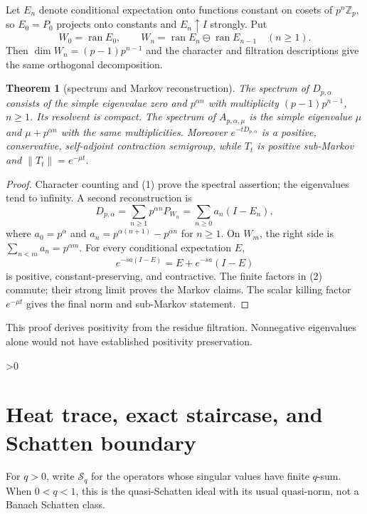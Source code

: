 \documentclass[10pt]{article}
\providecommand{\CRevisionRound}{2}
\newtheorem{theorem}{Theorem}
\newcommand{\Zp}{\mathbb Z_p}
\newcommand{\ran}{\operatorname{ran}}
\begin{document}
Let $E_n$ denote conditional expectation onto functions constant on cosets of
$p^n\Zp$, so $E_0=P_0$ projects onto constants and $E_n\uparrow I$ strongly.
Put
\[
 W_0=\ran E_0,\qquad W_n=\ran E_n\ominus\ran E_{n-1}\quad(n\geq1).
\]
Then $\dim W_n=(p-1)p^{n-1}$ and the character and filtration descriptions
give the same orthogonal decomposition.

\begin{theorem}[spectrum and Markov reconstruction]
The spectrum of $D_{p,\alpha}$ consists of the simple eigenvalue zero and
$p^{\alpha n}$ with multiplicity $(p-1)p^{n-1}$, $n\geq1$.  Its resolvent is
compact.  The spectrum of $A_{p,\alpha,\mu}$ is the simple eigenvalue $\mu$
and $\mu+p^{\alpha n}$ with the same multiplicities.  Moreover
$e^{-tD_{p,\alpha}}$ is a positive, conservative,
self-adjoint contraction semigroup, while $T_t$ is positive sub-Markov and
$\lVert T_t\rVert=e^{-\mu t}$.
\end{theorem}
\begin{proof}
Character counting and (1) prove the spectral assertion; the eigenvalues tend
to infinity.  A second reconstruction is
\begin{equation}
 D_{p,\alpha}=\sum_{n\geq1}p^{\alpha n}P_{W_n}
 =\sum_{n\geq0}a_n(I-E_n),                                \tag{2}
\end{equation}
where $a_0=p^\alpha$ and
$a_n=p^{\alpha(n+1)}-p^{\alpha n}$ for $n\geq1$.  On $W_m$, the right side
is $\sum_{n<m}a_n=p^{\alpha m}$.  For every conditional expectation $E$,
\[
 e^{-s a(I-E)}=E+e^{-sa}(I-E)
\]
is positive, constant-preserving, and contractive.  The finite factors in
(2) commute; their strong limit proves the Markov claims.  The scalar killing
factor $e^{-\mu t}$ gives the final norm and sub-Markov statement.
\end{proof}

This proof derives positivity from the residue filtration.  Nonnegative
eigenvalues alone would not have established positivity preservation.

\ifnum\CRevisionRound>0
\section{Heat trace, exact staircase, and Schatten boundary}
For $q>0$, write $\mathcal S_q$ for the operators whose singular values have
finite $q$-sum.  When $0<q<1$, this is the quasi-Schatten ideal with its usual
quasi-norm, not a Banach Schatten class.
\end{document}
